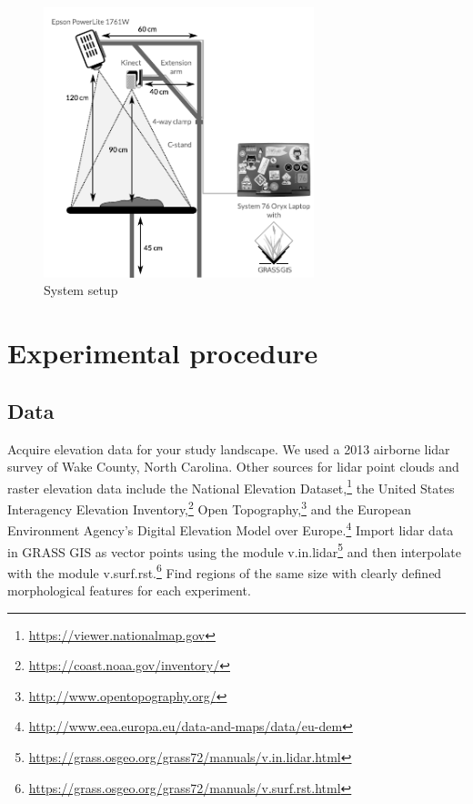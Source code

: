 \documentclass[prodmode,acmtochi]{acmsmall} %
\begin{document}
\begin{figure}
\begin{center}
	\includegraphics[width=0.7\textwidth]{images/system_setup.pdf}
	\caption{System setup}
	\label{fig:system_setup}
\end{center}
\end{figure}

\vfill
\clearpage

\section{Experimental procedure}\label{appendix:procedure}

\subsection{Data}\label{appendix:data}
Acquire elevation data for your study landscape.
We used a 2013 airborne lidar survey of Wake County, North Carolina. 
Other sources for lidar point clouds and raster elevation data 
include the National Elevation Dataset,\footnote{
\url{https://viewer.nationalmap.gov}}
the United States Interagency Elevation Inventory,\footnote{
\url{https://coast.noaa.gov/inventory/}}
Open Topography,\footnote{
\url{http://www.opentopography.org/}}
and the European Environment Agency's
Digital Elevation Model over Europe.\footnote{
\url{http://www.eea.europa.eu/data-and-maps/data/eu-dem}}
%
Import lidar data in GRASS GIS as vector points using the module v.in.lidar\footnote{
\url{https://grass.osgeo.org/grass72/manuals/v.in.lidar.html}}
and then interpolate with the module v.surf.rst.\footnote{
\url{https://grass.osgeo.org/grass72/manuals/v.surf.rst.html}}
%
Find regions of the same size with clearly defined morphological features 
for each experiment. 
\end{document}
